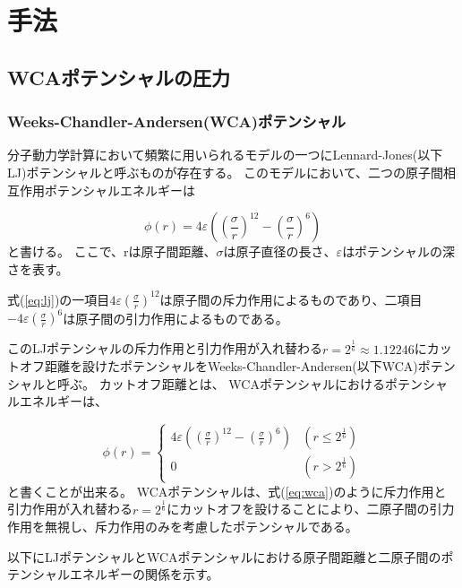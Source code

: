 \documentclass[titlepage]{jsreport}
\begin{document}
\chapter{手法} \label{chap:method}
\section{WCAポテンシャルの圧力}\label{method-sec:WCA-press}
\subsection{Weeks-Chandler-Andersen(WCA)ポテンシャル}\label{method-subsec:WCA}
分子動力学計算において頻繁に用いられるモデルの一つにLennard-Jones(以下LJ)ポテンシャルと呼ぶものが存在する。
このモデルにおいて、二つの原子間相互作用ポテンシャルエネルギーは

\large
\begin{equation}
\phi(r)=4{\varepsilon}\left(\left(\frac{\sigma}{r}\right)^{12}-\left(\frac{\sigma}{r}\right)^6\right)\label{eq:lj}
\end{equation}
\normalsize
と書ける\cite{WATANABE20191}。
ここで、rは原子間距離、${\sigma}$は原子直径の長さ、${\varepsilon}$はポテンシャルの深さを表す。

式(\ref{eq:lj})の一項目$4{\varepsilon}(\frac{\sigma}{r})^{12}$は原子間の斥力作用によるものであり、二項目$-4\varepsilon(\frac{\sigma}{r})^{6}$は原子間の引力作用によるものである。

このLJポテンシャルの斥力作用と引力作用が入れ替わる$r=2^{\frac{1}{6}}{\approx}1.12246$にカットオフ距離を設けたポテンシャルをWeeks-Chandler-Andersen(以下WCA)ポテンシャルと呼ぶ。
カットオフ距離とは、
WCAポテンシャルにおけるポテンシャルエネルギーは、

\large
\begin{equation}
\phi(r) = \left\{ \begin{array}{ll}
    4{\varepsilon}\left(\left(\frac{\sigma}{r}\right)^{12}-\left(\frac{\sigma}{r}\right)^6\right) & (r\leq2^{\frac{1}{6}}) \\
    0 & (r>2^{\frac{1}{6}})\label{eq:wca}
\end{array} \right.
\end{equation}
\normalsize
と書くことが出来る\cite{doi:10.1063/1.2176675}。
WCAポテンシャルは、式(\ref{eq:wca})のように斥力作用と引力作用が入れ替わる$r=2^{\frac{1}{6}}$にカットオフを設けることにより、二原子間の引力作用を無視し、斥力作用のみを考慮したポテンシャルである。

以下にLJポテンシャルとWCAポテンシャルにおける原子間距離と二原子間のポテンシャルエネルギーの関係を示す。
\end{document}
